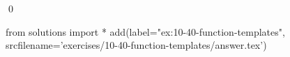 
\begin{ex}
  \label{ex:10-40-function-templates}
  
  \qed
\end{ex}
\begin{python0}
from solutions import *
add(label="ex:10-40-function-templates",
    srcfilename='exercises/10-40-function-templates/answer.tex')
\end{python0}
